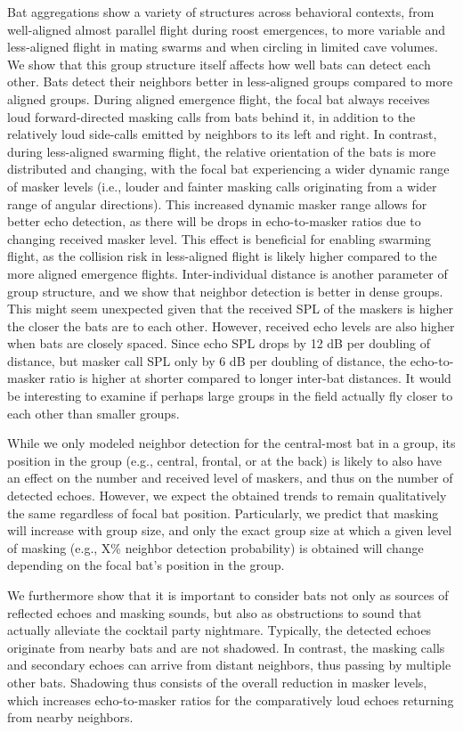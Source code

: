 \documentclass[
]{book}
\begin{document}
Bat aggregations show a variety of structures across behavioral contexts, from well-aligned almost parallel flight during roost emergences, to more variable and less-aligned flight in mating swarms and when circling in limited cave volumes. We show that this group structure itself affects how well bats can detect each other. Bats detect their neighbors better in less-aligned groups compared to more aligned groups. During aligned emergence flight, the focal bat always receives loud forward-directed masking calls from bats behind it, in addition to the relatively loud side-calls emitted by neighbors to its left and right. In contrast, during less-aligned swarming flight, the relative orientation of the bats is more distributed and changing, with the focal bat experiencing a wider dynamic range of masker levels (i.e., louder and fainter masking calls originating from a wider range of angular directions). This increased dynamic masker range allows for better echo detection, as there will be drops in echo-to-masker ratios due to changing received masker level. This effect is beneficial for enabling swarming flight, as the collision risk in less-aligned flight is likely higher compared to the more aligned emergence flights. Inter-individual distance is another parameter of group structure, and we show that neighbor detection is better in dense groups. This might seem unexpected given that the received SPL of the maskers is higher the closer the bats are to each other. However, received echo levels are also higher when bats are closely spaced. Since echo SPL drops by 12 dB per doubling of distance, but masker call SPL only by 6 dB per doubling of distance, the echo-to-masker ratio is higher at shorter compared to longer inter-bat distances. It would be interesting to examine if perhaps large groups in the field actually fly closer to each other than smaller groups.

While we only modeled neighbor detection for the central-most bat in a group, its position in the group (e.g., central, frontal, or at the back) is likely to also have an effect on the number and received level of maskers, and thus on the number of detected echoes. However, we expect the obtained trends to remain qualitatively the same regardless of focal bat position. Particularly, we predict that masking will increase with group size, and only the exact group size at which a given level of masking (e.g., X\% neighbor detection probability) is obtained will change depending on the focal bat's position in the group.

We furthermore show that it is important to consider bats not only as sources of reflected echoes and masking sounds, but also as obstructions to sound that actually alleviate the cocktail party nightmare. Typically, the detected echoes originate from nearby bats and are not shadowed. In contrast, the masking calls and secondary echoes can arrive from distant neighbors, thus passing by multiple other bats. Shadowing thus consists of the overall reduction in masker levels, which increases echo-to-masker ratios for the comparatively loud echoes returning from nearby neighbors.
\end{document}
